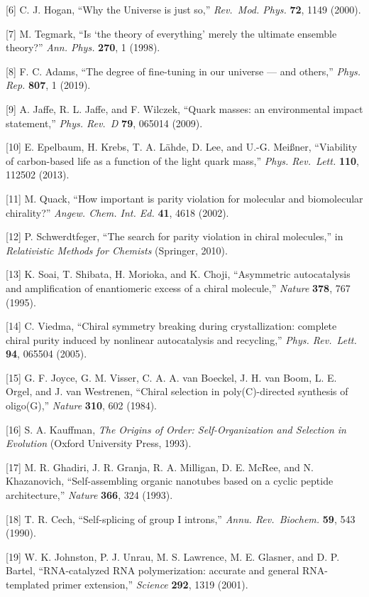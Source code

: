 \documentclass[
]{article}
\begin{document}
{[}6{]} C. J. Hogan, ``Why the Universe is just so,'' \emph{Rev.~Mod.
Phys.} \textbf{72}, 1149 (2000).

{[}7{]} M. Tegmark, ``Is `the theory of everything' merely the ultimate
ensemble theory?'' \emph{Ann. Phys.} \textbf{270}, 1 (1998).

{[}8{]} F. C. Adams, ``The degree of fine-tuning in our universe --- and
others,'' \emph{Phys. Rep.} \textbf{807}, 1 (2019).

{[}9{]} A. Jaffe, R. L. Jaffe, and F. Wilczek, ``Quark masses: an
environmental impact statement,'' \emph{Phys. Rev.~D} \textbf{79},
065014 (2009).

{[}10{]} E. Epelbaum, H. Krebs, T. A. Lähde, D. Lee, and U.-G. Meißner,
``Viability of carbon-based life as a function of the light quark
mass,'' \emph{Phys. Rev.~Lett.} \textbf{110}, 112502 (2013).

{[}11{]} M. Quack, ``How important is parity violation for molecular and
biomolecular chirality?'' \emph{Angew. Chem. Int. Ed.} \textbf{41}, 4618
(2002).

{[}12{]} P. Schwerdtfeger, ``The search for parity violation in chiral
molecules,'' in \emph{Relativistic Methods for Chemists} (Springer,
2010).

{[}13{]} K. Soai, T. Shibata, H. Morioka, and K. Choji, ``Asymmetric
autocatalysis and amplification of enantiomeric excess of a chiral
molecule,'' \emph{Nature} \textbf{378}, 767 (1995).

{[}14{]} C. Viedma, ``Chiral symmetry breaking during crystallization:
complete chiral purity induced by nonlinear autocatalysis and
recycling,'' \emph{Phys. Rev.~Lett.} \textbf{94}, 065504 (2005).

{[}15{]} G. F. Joyce, G. M. Visser, C. A. A. van Boeckel, J. H. van
Boom, L. E. Orgel, and J. van Westrenen, ``Chiral selection in
poly(C)-directed synthesis of oligo(G),'' \emph{Nature} \textbf{310},
602 (1984).

{[}16{]} S. A. Kauffman, \emph{The Origins of Order: Self-Organization
and Selection in Evolution} (Oxford University Press, 1993).

{[}17{]} M. R. Ghadiri, J. R. Granja, R. A. Milligan, D. E. McRee, and
N. Khazanovich, ``Self-assembling organic nanotubes based on a cyclic
peptide architecture,'' \emph{Nature} \textbf{366}, 324 (1993).

{[}18{]} T. R. Cech, ``Self-splicing of group I introns,'' \emph{Annu.
Rev.~Biochem.} \textbf{59}, 543 (1990).

{[}19{]} W. K. Johnston, P. J. Unrau, M. S. Lawrence, M. E. Glasner, and
D. P. Bartel, ``RNA-catalyzed RNA polymerization: accurate and general
RNA-templated primer extension,'' \emph{Science} \textbf{292}, 1319
(2001).
\end{document}
